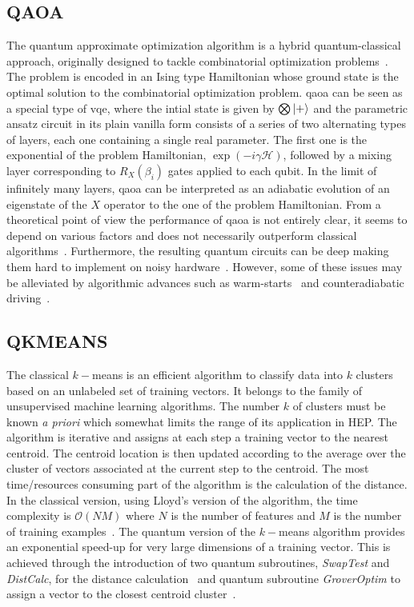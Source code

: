 \subsection{QAOA}

The quantum approximate optimization algorithm is a hybrid quantum-classical approach, originally designed to tackle combinatorial optimization problems~\cite{farhi2014quantum}. The problem is encoded in an Ising type Hamiltonian whose ground state is the optimal solution to the combinatorial optimization problem. \gls{qaoa} can be seen as a special type of \gls{vqe}, where the intial state is given by $\bigotimes \ket{+}$ and the parametric ansatz circuit in its plain vanilla form consists of a series of two alternating types of layers, each one containing a single real parameter. The first one is the exponential of the problem Hamiltonian, $\exp(-i\gamma \mathcal{H})$,  followed by a mixing layer corresponding to $R_X(\beta_i)$ gates applied to each qubit. In the limit of infinitely many layers, \gls{qaoa} can be interpreted as an adiabatic evolution of an eigenstate of the $X$ operator to the one of the problem Hamiltonian. From a theoretical point of view the performance of \gls{qaoa} is not entirely clear, it seems to depend on various factors and does not necessarily outperform classical algorithms~\cite{farhi2016quantum,barak_et_al:LIPIcs.ITCS.2022.14,Akshay2020}. 
Furthermore, the resulting quantum circuits can be deep making them hard to implement on noisy hardware~\cite{franca2020limitations, Weidenfeller2022scalingofquantum}. However, some of these issues may be alleviated by algorithmic advances such as warm-starts~\cite{Egger2021warmstartingquantum} and counteradiabatic driving~\cite{Wurtz2022counterdiabaticity}. 



\subsection{QKMEANS}

The classical $k-$means is an efficient algorithm to classify data into $k$ clusters based on an unlabeled set of training vectors. 
It belongs to the family of unsupervised machine learning algorithms. The number $k$ of clusters must be known \textit{a priori} which somewhat limits the range of its application in HEP. The algorithm is iterative and assigns at each step a training vector to the nearest centroid. The centroid location is then updated according to the average over the cluster of vectors associated at the current step to the centroid. The most time/resources consuming part of the algorithm is the calculation of the distance.
In the classical version, using Lloyd's version of the algorithm, the time complexity is $\mathcal{O}(NM)$ where $N$ is the number of features and $M$ is the number of training examples~\cite{Lloyd82,Lloyd2013,Kopzyk2018}. The quantum version of the $k-$means algorithm provides an exponential speed-up for very large dimensions of a training vector. This is achieved through the introduction of two quantum subroutines, \textit{SwapTest} and \textit{DistCalc}, for the distance calculation~\cite{Aimeretal2006} and quantum subroutine \textit{GroverOptim} to assign a vector to the closest centroid cluster~\cite{Hoyer-Durr96}.

